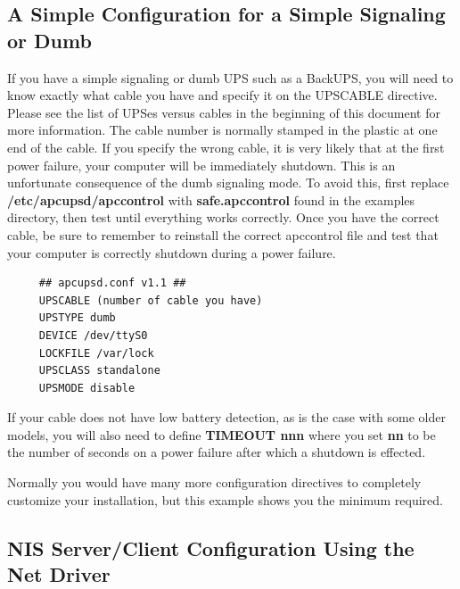\label{A-Simple-Configuration-for-a-Simple-Signaling-or-Dumb}

\subsection*{A Simple Configuration for a Simple Signaling or Dumb}

\label{index-Configuration_002c-dumb-71}
\label{index-dumb_002c-configuration-72}
\label{index-Example_002c-dumb-conf-73}
If you have a simple signaling or dumb UPS such as a BackUPS, you will need to
know exactly what cable you have and specify it on the UPSCABLE directive.
Please see the list of UPSes versus cables in the beginning of this document
for more information. The cable number is normally stamped in the plastic at
one end of the cable. If you specify the wrong cable, it is very likely that
at the first power failure, your computer will be immediately shutdown. This
is an unfortunate consequence of the dumb signaling mode.  To avoid this,
first replace {\bf /etc/apcupsd/apccontrol} with {\bf safe.apccontrol} found
in the examples directory, then test until everything works correctly. Once
you have the correct cable, be sure to remember to reinstall the correct
apccontrol file and test that your computer is correctly shutdown during a
power failure. 

\footnotesize
\begin{verbatim}
     ## apcupsd.conf v1.1 ##
     UPSCABLE (number of cable you have)
     UPSTYPE dumb
     DEVICE /dev/ttyS0
     LOCKFILE /var/lock
     UPSCLASS standalone
     UPSMODE disable
\end{verbatim}
\normalsize

If your cable does not have low battery detection, as is the case with some
older models, you will also need to define {\bf TIMEOUT nnn} where you set
{\bf nn} to be the number of seconds on a power failure after which a shutdown
is effected.  

Normally you would have many more configuration directives to completely
customize your installation, but this example shows you the minimum required. 

\label{A-Sample-NIS-Slave-Configuration-Using-the-Net-Driver}

\subsection*{NIS Server/Client Configuration Using the Net Driver}


